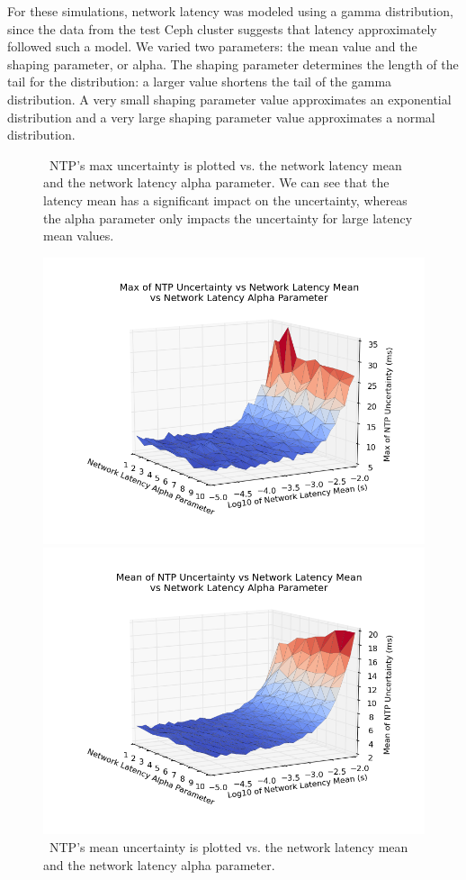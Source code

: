 For these simulations, network latency was modeled using a gamma
distribution,
since the data from the test Ceph cluster suggests that
latency approximately followed such a model. We varied two parameters:
the mean value and the shaping parameter, or alpha. The shaping parameter 
determines the length of the tail for the distribution: a larger value 
shortens the tail of the gamma
distribution.  A very small shaping parameter value approximates an
exponential distribution and a very large shaping parameter value
approximates a normal distribution.


\begin{figure}[!htbp]
  \caption{~NTP's max uncertainty is plotted vs. the network latency mean and the network latency alpha parameter. We can see that the latency mean has a significant impact on the uncertainty, whereas the alpha parameter only impacts the uncertainty for large latency mean values.}
  \label{fig:max-uncertainty_latency-mean_latency-alpha}
  \includegraphics[width=0.8\linewidth]{max_error-latency_mean-latency_alpha.png}

  \caption{~NTP's mean uncertainty is plotted vs. the network latency mean and the network latency alpha parameter.}
  \label{fig:mean-uncertainty_latency-mean_latency-alpha}
  \includegraphics[width=0.8\linewidth]{mean_max_error-mean_latency-latency_alpha.png}  
\end{figure}
